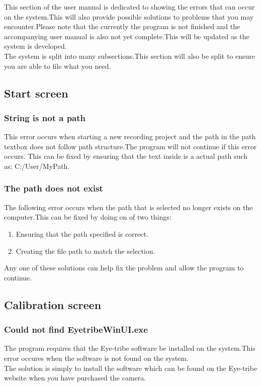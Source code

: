 This section of the user manual is dedicated to showing the errors that can occur on the system.This will also provide possible solutions to problems that you may encounter.Please note that the currently the program is not finished and the accompanying user manual is also not yet complete.This will be updated as the system is developed.\\

The system is split into many subsections.This section will also be split to ensure you are able to file what you need.

\subsection{Start screen}
\subsubsection{String is not a path}
This error occurs when starting a new recording project and the path in the path textbox does not follow path structure.The program will not continue if this error occurs.
This can be fixed by ensuring that the text inside is a actual path such as: C:/User/MyPath.
\subsubsection{The path does not exist}
The following error occurs when the path that is selected no longer exists on the computer.This can be fixed by doing on of two things:\\
\begin{enumerate}
\item Ensuring that the path specified is correct.
\item Creating the file path to match the selection. 
\end{enumerate}
Any one of these solutions can help fix the problem and allow the program to continue.
\subsection{Calibration screen}
\subsubsection{Could not find EyetribeWinUI.exe}
The program requires that the Eye-tribe software be installed on the system.This error occures when the software is not found on the system.\\
The solution is simply to install the software which can be found on the Eye-tribe website when you have purchased the camera.
